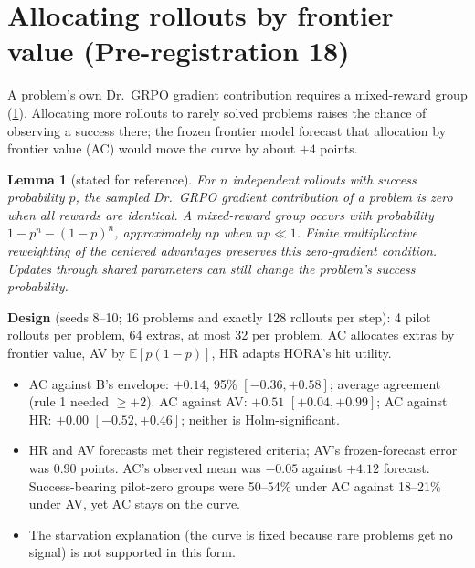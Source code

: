 \documentclass[11pt]{article}
\newtheorem{lemma}{Lemma}
\newcommand{\E}{\mathbb{E}}
\begin{document}
\section{Allocating rollouts by frontier value (Pre-registration 18)}
\begin{why}
A problem's own Dr.\ GRPO gradient contribution requires a mixed-reward group (\cref{lem:starve-story}). Allocating more rollouts to rarely solved problems raises the chance of observing a success there; the frozen frontier model forecast that allocation by frontier value (AC) would move the curve by about $+4$ points.
\end{why}
\begin{lemma}[stated for reference]\label{lem:starve-story}
For $n$ independent rollouts with success probability $p$, the sampled Dr.\ GRPO gradient contribution of a problem is zero when all rewards are identical. A mixed-reward group occurs with probability $1-p^n-(1-p)^n$, approximately $np$ when $np\ll1$. Finite multiplicative reweighting of the centered advantages preserves this zero-gradient condition. Updates through shared parameters can still change the problem's success probability.
\end{lemma}
\textbf{Design} (seeds 8--10; 16 problems and exactly 128 rollouts per step): 4 pilot rollouts per problem, 64 extras, at most 32 per problem. AC allocates extras by frontier value, AV by $\E[p(1-p)]$, HR adapts HORA's hit utility.
\begin{found}
\begin{itemize}[leftmargin=*,itemsep=1pt]
\item AC against B's envelope: $+0.14$, 95\% $[-0.36,+0.58]$; average agreement (rule 1 needed $\ge+2$). AC against AV: $+0.51$ $[+0.04,+0.99]$; AC against HR: $+0.00$ $[-0.52,+0.46]$; neither is Holm-significant.
\item HR and AV forecasts met their registered criteria; AV's frozen-forecast error was 0.90 points. AC's observed mean was $-0.05$ against $+4.12$ forecast. Success-bearing pilot-zero groups were 50--54\% under AC against 18--21\% under AV, yet AC stays on the curve.
\item The starvation explanation (the curve is fixed because rare problems get no signal) is not supported in this form.
\end{itemize}
\end{found}
\end{document}
